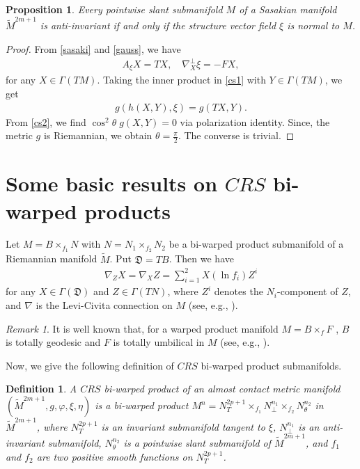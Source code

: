 \documentclass[reqno]{amsart}
\theoremstyle{plain}
\newtheorem{proposition}{Proposition}[section]
\newtheorem{definition}{Definition}[section]
\theoremstyle{remark}
\newtheorem{remark}{Remark}[section]
\numberwithin{equation}{section}
\begin{document}
\begin{proposition}\label{P:2.1CS} Every pointwise slant submanifold $M$ of a Sasakian manifold $\widetilde M^{2m+1}$ is anti-invariant if and only if the structure vector field $\xi$ is normal to $M$.
\end{proposition}
\begin{proof}
From \eqref{sasaki} and \eqref{gauss}, we have
\begin{align}
 \label{cs1}
 A_\mathfrak{\xi}X=TX,\quad
 \nabla^\perp_X\xi=-FX,
 \end{align}
 for any $X\in\Gamma(TM)$. Taking the inner product in \eqref{cs1} with $Y\in\Gamma(TM)$, we get
 \begin{align}
 \label{cs2}
 g(h(X, Y), \mathfrak{\xi})=g(TX, Y).
 \end{align}
 From \eqref{cs2}, we find $\cos^2\theta\;g(X, Y)=0$ via polarization identity. Since, the metric $g$ is Riemannian,  we obtain $\theta=\frac{\pi}{2}$. The converse is trivial. 
\end{proof}







\section{Some basic results on $CRS$ bi-warped products}\label{S3}

Let $M=B\times_{f_1}N$ with $N=N_1\times_{f_2}N_2$ be a bi-warped product submanifold of a Riemannian manifold $\widetilde M$. Put ${\mathfrak{D}}=TB$. Then we have
\begin{align}\label{warped} \nabla_ZX= \nabla_XZ=\sum_{i=1}^2X(\ln f_i) Z^i \end{align}
for any $X\in \Gamma({\mathfrak{D}})$ and $Z\in\Gamma(TN)$, where  $Z^i$ denotes the $N_i$-component of $Z$, and $\nabla$ is the Levi-Civita connection on $M$ (see, e.g., \cite{UFH}).

\begin{remark}\label{R:3.1} It is well known that, for a warped product manifold $M=B\times_fF$ , $B$ is totally geodesic and $F$ is totally umbilical in $M$ (see, e.g., \cite{C3,oneill}).
\end{remark}

Now, we give the following definition of $CRS$ bi-warped product submanifolds.

\begin{definition}\label{D:3.1} {\rm A {\it $CRS$ bi-warped product} of an almost contact metric manifold $(\widetilde M^{2m+1},g,\varphi,\xi,\eta)$ is a bi-warped product $M^n=N_{T}^{2p+1}\times_{f_1}N^{n_1}_\perp\times_{f_2}N^{n_2}_\theta$ in $\widetilde M^{2m+1}$, where $N_{T}^{2p+1}$ is an invariant submanifold tangent to $\xi$, $N^{n_1}_\perp$ is an anti-invariant submanifold,  $N^{n_2}_\theta$ is a pointwise slant submanifold of $\widetilde M^{2m+1}$, and $f_{1}$ and $f_{2}$ are two positive smooth functions on $N_{T}^{2p+1}$.} \end{definition}
\end{document}
